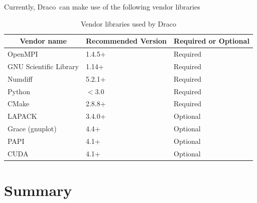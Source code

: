 \documentclass[note]{newmemo}
\newcommand{\draco}{{\normalfont\small\sffamily Draco}}
\begin{document}
Currently, \draco\ can make use of the following vendor libraries
%
\begin{table}[ht]
  \caption{Vendor libraries used by \draco}
  \label{tab:vendors}
\begin{center}
\begin{tabular}{lll} \hline\hline
\multicolumn{1}{c}{Vendor name} & 
\multicolumn{1}{c}{Recommended Version} & 
\multicolumn{1}{c}{Required or Optional} \\ \hline
OpenMPI                & 1.4.5+ & Required \\
GNU Scientific Library & 1.14+  & Required \\
Numdiff                & 5.2.1+ & Required \\
Python                 & $<$3.0 & Required \\
CMake                  & 2.8.8+ & Required \\
LAPACK                 & 3.4.0+ & Optional \\
Grace (gnuplot)        & 4.4+   & Optional \\
PAPI                   & 4.1+   & Optional \\
CUDA & 4.1+ & Optional \\
\hline\hline
\end{tabular}
\end{center}
\end{table}





\section{Summary}
\label{sec:summary}
\end{document}
